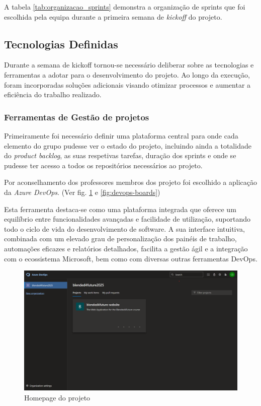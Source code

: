 A tabela \ref{tab:organizacao_sprints} demonstra a organização de sprints que foi escolhida pela equipa durante a primeira semana de \textit{kickoff} do projeto.


\subsection{Tecnologias Definidas}

Durante a semana de kickoff tornou-se necessário deliberar sobre as tecnologias e ferramentas a adotar para o desenvolvimento do projeto. Ao longo da execução, foram incorporadas soluções adicionais visando otimizar processos e aumentar a eficiência do trabalho realizado.

\subsubsection{Ferramentas de Gestão de projetos}

Primeiramente foi necessário definir uma plataforma central para onde cada elemento do grupo pudesse ver o estado do projeto, incluindo ainda a totalidade do \textit{product backlog}, as suas respetivas tarefas, duração dos sprints e onde se pudesse ter acesso a todos os repositórios necessários ao projeto.

Por aconselhamento dos professores membros dos projeto foi escolhido a aplicação da \textit{Azure DevOps}. (Ver fig. \ref{fig:devops-homepage} e \ref{fig:devops-boards})

Esta ferramenta destaca-se como uma plataforma integrada que oferece um equilíbrio entre funcionalidades avançadas e facilidade de utilização, suportando todo o ciclo de vida do desenvolvimento de software. A sua interface intuitiva, combinada com um elevado grau de personalização dos painéis de trabalho, automações eficazes e relatórios detalhados, facilita a gestão ágil e a integração com o ecossistema Microsoft, bem como com diversas outras ferramentas DevOps. 

\begin{figure}[h!tbp]
    \includegraphics[width=\linewidth]{capitulos/cap1-introducao/imagens/ferramentas/devops-homepage.png}
    \caption{Homepage do projeto}
    \label{fig:devops-homepage}
\end{figure}

